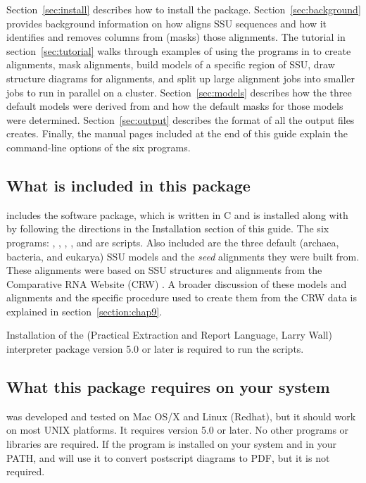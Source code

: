 Section~\ref{sec:install} describes how to install the
package. Section~\ref{sec:background} provides background
information on how  aligns SSU sequences and how it
identifies and removes columns from (masks) those alignments.
The tutorial in section~\ref{sec:tutorial} walks through examples of using
the programs in  to create alignments, 
mask alignments, build models of a specific region of SSU, draw
structure diagrams for alignments, and split up large alignment jobs
into smaller jobs to run in parallel on a cluster.
Section~\ref{sec:models} describes how the three default models were
derived from  and how the default masks for those models were
determined. Section~\ref{sec:output} describes the
format of all the output files  creates. Finally, the
 manual pages included at the end of this guide explain
the command-line options of the six programs.

\subsection{What is included in this package}

 includes the  software package, which is
written in C and is installed along with  by following
the directions in the Installation section of this guide. The six
 programs: , ,
, ,  and 
are  scripts.  Also included are the three default (archaea,
bacteria, and eukarya) SSU models and the \emph{seed} alignments they
were built from. These alignments were based on SSU structures and
alignments from the Comparative RNA Website (CRW)
\cite{CannoneGutell02}. A broader discussion of these models and
alignments and the specific procedure used to create them from the CRW
data is explained in section~\ref{section:chap9}.

Installation of the  (Practical Extraction and Report Language,
Larry Wall) interpreter package version 5.0 or later is required to
run the   scripts.

\subsection{What this package requires on your system}

 was developed and tested on Mac OS/X and Linux
(Redhat), but it should work on most UNIX platforms. It requires
 version 5.0 or later. No other programs or libraries
are required. If the program  is installed on
your system and in your PATH,  and  will
use it to convert postscript diagrams to PDF, but it is not required. 

